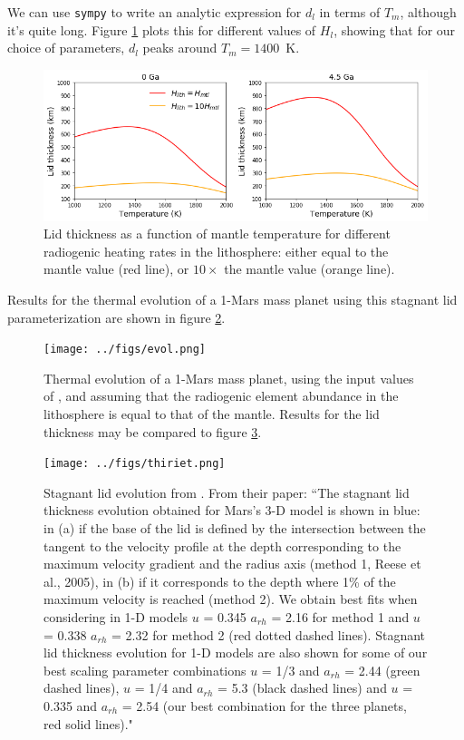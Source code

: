 \documentclass[10pt,a4paper]{article}
\begin{document}
We can use {\tt sympy} to write an analytic expression for $d_l$ in terms of $T_m$, although it's quite long. Figure \ref{fig:d_fT} plots this for different values of $H_l$, showing that for our choice of parameters, $d_l$ peaks around $T_m = 1400$~K. 

\begin{figure}
\centering
\includegraphics[width=\textwidth]{../d_T.png} 
 \caption{Lid thickness as a function of mantle temperature for different radiogenic heating rates in the lithosphere: either equal to the mantle value (red line), or $10\times$ the mantle value (orange line). \label{fig:d_fT}}
\end{figure}

Results for the thermal evolution of a 1-Mars mass planet using this stagnant lid parameterization are shown in figure \ref{fig:evol-lid}.

\begin{figure}
\texttt{[image: ../figs/evol.png]} 
\caption{Thermal evolution of a 1-Mars mass planet, using the input values of \citet{Thiriet2019}, and assuming that the radiogenic element abundance in the lithosphere is equal to that of the mantle. Results for the lid thickness may be compared to figure \ref{fig:thiriet-lid}. \label{fig:evol-lid}}
\end{figure}

\begin{figure}
        \texttt{[image: ../figs/thiriet.png]} 
        \caption{Stagnant lid evolution from \citet{Thiriet2019}. From their paper: {\footnotesize ``The stagnant lid thickness evolution obtained for Mars’s 3-D model is shown in blue: in (a) if the base of the lid is defined by the intersection between the tangent to the velocity profile at the depth corresponding to the maximum velocity gradient and the radius axis (method 1, Reese et al., 2005), in (b) if it corresponds to the depth where 1\% of the maximum velocity is reached (method 2). We obtain best fits when considering in 1-D models $u$ = 0.345 $a_{rh}$ = 2.16 for method 1 and $u$ = 0.338 $a_{rh}$ = 2.32 for method 2 (red dotted dashed lines). Stagnant lid thickness evolution for 1-D models are also shown for some of our best scaling parameter combinations $u$ = 1/3 and $a_{rh}$ = 2.44 (green
dashed lines), $u$ = 1/4 and $a_{rh}$ = 5.3 (black dashed lines) and $u$ = 0.335 and $a_{rh}$ = 2.54 (our best combination for the three planets, red solid lines)."} \label{fig:thiriet-lid}}
\end{figure}
\end{document}
